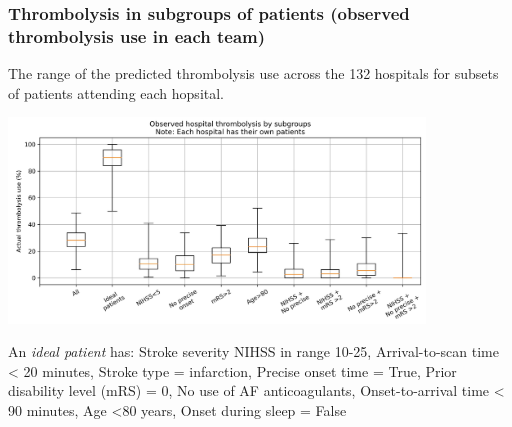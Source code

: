 \begin{frame}
\frametitle{Thrombolysis in subgroups of patients (observed thrombolysis use in each team)}

\footnotesize The range of the predicted thrombolysis use across the 132 hospitals for subsets of patients attending each hopsital. 

\begin{center}
\includegraphics[width=0.83\textwidth]{./images/15b_actual_subgroup_violin.jpg}
\end{center}

\scriptsize An \emph{ideal patient} has: Stroke severity NIHSS in range 10-25, Arrival-to-scan time \textless{} 20 minutes, Stroke type = infarction, Precise onset time = True, Prior disability level (mRS) = 0, No use of AF anticoagulants, Onset-to-arrival time \textless{} 90 minutes, Age \textless{80 years}, Onset during sleep = False
\end{frame}